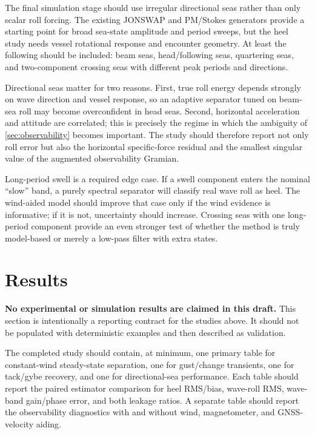\documentclass[conference]{IEEEtran}
\begin{document}
The final simulation stage should use irregular directional seas rather than only scalar
roll forcing. The existing JONSWAP and PM/Stokes generators provide a starting point for
broad sea-state amplitude and period sweeps, but the heel study needs vessel rotational
response and encounter geometry. At least the following should be included: beam seas,
head/following seas, quartering seas, and two-component crossing seas with different peak
periods and directions.

Directional seas matter for two reasons. First, true roll energy depends strongly on wave
direction and vessel response, so an adaptive separator tuned on beam-sea roll may become
overconfident in head seas. Second, horizontal acceleration and attitude are correlated;
this is precisely the regime in which the ambiguity of \cref{sec:observability} becomes
important. The study should therefore report not only roll error but also the horizontal
specific-force residual and the smallest singular value of the augmented observability
Gramian.

Long-period swell is a required edge case. If a swell component enters the nominal
``slow'' band, a purely spectral separator will classify real wave roll as heel. The
wind-aided model should improve that case only if the wind evidence is informative; if it
is not, uncertainty should increase. Crossing seas with one long-period component provide
an even stronger test of whether the method is truly model-based or merely a low-pass
filter with extra states.

\section{Results}
\label{sec:results}

\textbf{No experimental or simulation results are claimed in this draft.} This section
is intentionally a reporting contract for the studies above. It should not be populated
with deterministic examples and then described as validation.

The completed study should contain, at minimum, one primary table for constant-wind
steady-state separation, one for gust/change transients, one for tack/gybe recovery, and
one for directional-sea performance. Each table should report the paired estimator
comparison for heel RMS/bias, wave-roll RMS, wave-band gain/phase error, and both leakage
ratios. A separate table should report the observability diagnostics with and without
wind, magnetometer, and GNSS-velocity aiding.
\end{document}
